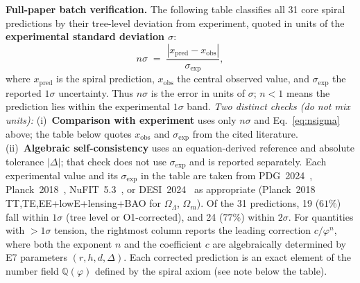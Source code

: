 \documentclass[12pt,a4paper]{article}
\begin{document}
\medskip
\noindent\textbf{Full-paper batch verification.}
The following table classifies all 31 core spiral predictions by their tree-level deviation from experiment, quoted in units of the \textbf{experimental standard deviation $\sigma$}:
\begin{equation}
\label{eq:nsigma}
n\sigma \;=\; \frac{|x_{\mathrm{pred}} - x_{\mathrm{obs}}|}{\sigma_{\mathrm{exp}}},
\end{equation}
where $x_{\mathrm{pred}}$ is the spiral prediction, $x_{\mathrm{obs}}$ the central observed value, and $\sigma_{\mathrm{exp}}$ the reported $1\sigma$ uncertainty. Thus $n\sigma$ is the error in units of $\sigma$; $n < 1$ means the prediction lies within the experimental $1\sigma$ band.
\emph{Two distinct checks (do not mix units):} (i)~\textbf{Comparison with experiment} uses only $n\sigma$ and Eq.~\eqref{eq:nsigma} above; the table below quotes $x_{\mathrm{obs}}$ and $\sigma_{\mathrm{exp}}$ from the cited literature. (ii)~\textbf{Algebraic self-consistency} uses an equation-derived reference and absolute tolerance $|\Delta|$; that check does not use $\sigma_{\mathrm{exp}}$ and is reported separately.
Each experimental value and its $\sigma_{\mathrm{exp}}$ in the table are taken from PDG~2024~\cite{PDG2024}, Planck~2018~\cite{Planck2018}, NuFIT~5.3~\cite{NuFIT53}, or DESI~2024~\cite{DESI2024} as appropriate (Planck~2018 TT,TE,EE+lowE+lensing+BAO for $\Omega_\Lambda$, $\Omega_m$).
Of the 31 predictions, 19 ($61\%$) fall within $1\sigma$ (tree level or O1-corrected), and 24 ($77\%$) within $2\sigma$.
For quantities with $>1\sigma$ tension, the rightmost column reports the leading correction $c/\varphi^n$, where both the exponent $n$ and the coefficient $c$ are algebraically determined by E7 parameters $(r,h,d,\Delta)$.
Each corrected prediction is an exact element of the number field $\mathbb{Q}(\varphi)$ defined by the spiral axiom (see note below the table).
\end{document}
